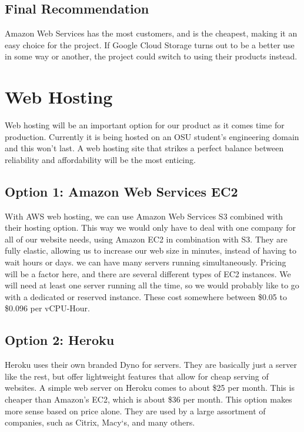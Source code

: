     \subsection{Final Recommendation}
        Amazon Web Services has the most customers, and is the cheapest, making it an easy choice for the project. If Google Cloud Storage turns out to be a better use in some way or another, the project could switch to using their products instead.
    
    \section{Web Hosting}
       Web hosting will be an important option for our product as it comes time for production. Currently it is being hosted on an OSU student's engineering domain and this won't last. A web hosting site that strikes a perfect balance between reliability and affordability will be the most enticing. 
       
    \subsection{Option 1: Amazon Web Services EC2}
        With AWS web hosting, we can use Amazon Web Services S3 combined with their hosting option. This way we would only have to deal with one company for all of our website needs, using Amazon EC2 in combination with S3. They are fully elastic, allowing us to increase our web size in minutes, instead of having to wait hours or days. we can have many servers running simultaneously. Pricing will be a factor here, and there are several different types of EC2 instances. We will need at least one server running all the time, so we would probably like to go with a dedicated or reserved instance. These cost somewhere between \$0.05 to \$0.096 per vCPU-Hour. \cite{awsinstance}
            
    \subsection{Option 2: Heroku}
        Heroku uses their own branded Dyno for servers. They are basically just a server like the rest, but offer lightweight features that allow for cheap serving of websites. A simple web server on Heroku comes to about \$25 per month. This is cheaper than Amazon's EC2, which is about \$36 per month. This option makes more sense based on price alone. They are used by a large assortment of companies, such as Citrix, Macy`s, and many others. \cite{heroku} 
            
